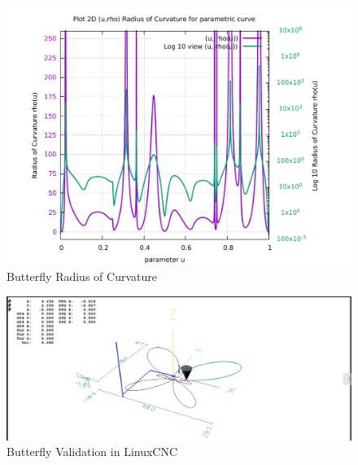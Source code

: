 \begin{figure}
	\caption     {Butterfly Radius of Curvature}
	\label{02-img-Butterfly Radius of Curvature.pdf}
	\includegraphics[width=1.00\textwidth]{Chap4/appendix/app-Butterfly/plots/02-img-Butterfly Radius of Curvature.pdf} 
\end{figure}	


\clearpage
\pagebreak

\begin{figure}
	\caption     {Butterfly Validation in LinuxCNC}
	\label{03-img-Butterfly-Validation-in-LinuxCNC.png}
	\includegraphics[width=1.00\textwidth]{Chap4/appendix/app-Butterfly/plots/03-img-Butterfly-Validation-in-LinuxCNC.png}
\end{figure}


